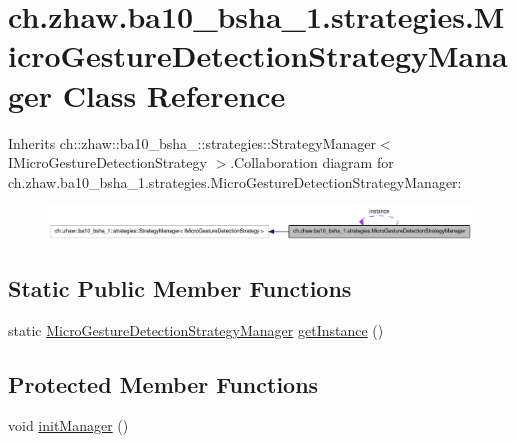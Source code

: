 \hypertarget{classch_1_1zhaw_1_1ba10__bsha__1_1_1strategies_1_1MicroGestureDetectionStrategyManager}{
\section{ch.zhaw.ba10\_\-bsha\_\-1.strategies.MicroGestureDetectionStrategyManager Class Reference}
\label{classch_1_1zhaw_1_1ba10__bsha__1_1_1strategies_1_1MicroGestureDetectionStrategyManager}
}


Inherits ch::zhaw::ba10\_\-bsha\_::strategies::StrategyManager$<$ IMicroGestureDetectionStrategy $>$.Collaboration diagram for ch.zhaw.ba10\_\-bsha\_\-1.strategies.MicroGestureDetectionStrategyManager:\nopagebreak
\begin{figure}[H]
\begin{center}
\leavevmode
\includegraphics[width=400pt]{classch_1_1zhaw_1_1ba10__bsha__1_1_1strategies_1_1MicroGestureDetectionStrategyManager__coll__graph}
\end{center}
\end{figure}
\subsection*{Static Public Member Functions}
\begin{DoxyCompactItemize}
\item 
static \hyperlink{classch_1_1zhaw_1_1ba10__bsha__1_1_1strategies_1_1MicroGestureDetectionStrategyManager}{MicroGestureDetectionStrategyManager} \hyperlink{classch_1_1zhaw_1_1ba10__bsha__1_1_1strategies_1_1MicroGestureDetectionStrategyManager_addeac950c5b59e0e2e6079b4339e890e}{getInstance} ()
\end{DoxyCompactItemize}
\subsection*{Protected Member Functions}
\begin{DoxyCompactItemize}
\item 
void \hyperlink{classch_1_1zhaw_1_1ba10__bsha__1_1_1strategies_1_1MicroGestureDetectionStrategyManager_ac04ebafa1a206ed3350296dee2b66698}{initManager} ()
\end{DoxyCompactItemize}

